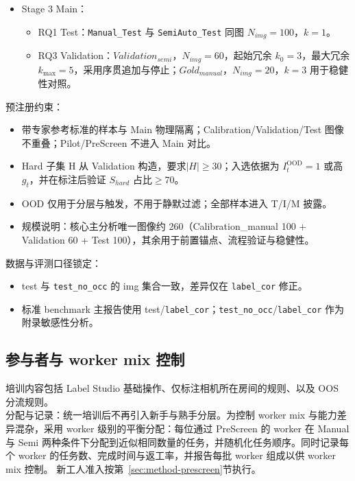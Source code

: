 \begin{itemize}
\begin{itemize}
    \end{itemize}
    \texttt{Calibration\_reserve} 的用途预注册写死为两类：其一为 CI 半宽未达标时追加；其二为核心场景启用率不足时的覆盖补齐。不得以提升路由收益为目标使用 reserve。
    \\
    \texttt{Calibration\_semi} 仅在从上述 100 张中预注册抽取的配对子集 $N_{img}=25$ 上收集，且每图冗余 $k=4$，用于 RQ2 的条件对照。为避免混杂，\texttt{Calibration\_semi} 不用于估计 $r_u$ 或 $r_u^{\left(s\right)}$。manual/semi 的顺序随机化。
    \item Stage 3 Main：
    \begin{itemize}
        \item RQ1 Test：\texttt{Manual\_Test} 与 \texttt{SemiAuto\_Test} 同图 $N_{img}=100$，$k=1$。
        \item RQ3 Validation：$Validation_{semi}$，$N_{img}=60$，起始冗余 $k_0=3$，最大冗余 $k_{\max}=5$，采用序贯追加与停止；$Gold_{manual}$，$N_{img}=20$，$k=3$ 用于稳健性对照。
    \end{itemize}
\end{itemize}
预注册约束：
\begin{itemize}
    \item 带专家参考标准的样本与 Main 物理隔离；Calibration/Validation/Test 图像不重叠；Pilot/PreScreen 不进入 Main 对比。
    \item Hard 子集 H 从 Validation 构造，要求$\left|H\right|\geq30$；入选依据为 $I_t^{\mathrm{OOD}}=1$ 或高 $g_t$，并在标注后验证 $S_{hard}$ 占比$\geq70$。
    \item OOD 仅用于分层与触发，不用于静默过滤；全部样本进入 T/I/M 披露。
    \item 规模说明：核心主分析唯一图像约 260（Calibration\_manual 100 + Validation 60 + Test 100），其余用于前置锚点、流程验证与稳健性。
\end{itemize}
数据与评测口径锁定：
\begin{itemize}
    \item test 与 \texttt{test\_no\_occ} 的 img 集合一致，差异仅在 \texttt{label\_cor} 修正。
    \item 标准 benchmark 主报告使用 test/\texttt{label\_cor}；\texttt{test\_no\_occ}/\texttt{label\_cor} 作为附录敏感性分析。
\end{itemize}
\subsection{参与者与 worker mix 控制}

培训内容包括 Label Studio 基础操作、仅标注相机所在房间的规则、以及 OOS 分流规则。
\\ 分配与记录：统一培训后不再引入新手与熟手分层。为控制 worker mix 与能力差异混杂，采用 worker 级别的平衡分配：每位通过 PreScreen 的 worker 在 Manual 与 Semi 两种条件下分配到近似相同数量的任务，并随机化任务顺序。同时记录每个 worker 的任务数、完成时间与返工率，并报告每批 worker 组成以供 worker mix 控制。
新工人准入按第~\ref{sec:method-prescreen}节执行。

